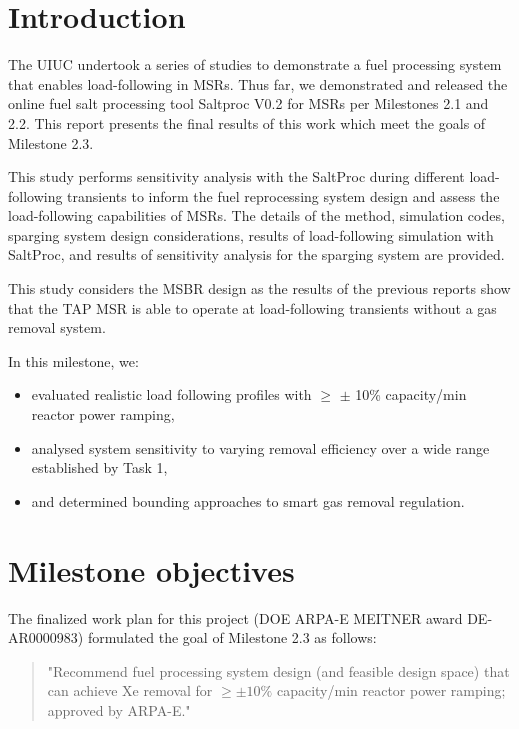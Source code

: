 \section{Introduction}

    The \gls{UIUC} undertook a series of 
    studies to demonstrate a fuel processing system that enables load-following 
    in \glspl{MSR}. Thus far, we demonstrated and released the 
    online fuel salt processing tool Saltproc V0.2 
    \cite{rykhlevskii_saltproc_2018} for \glspl{MSR} per Milestones 
    2.1 and 2.2. This report presents the final results of this work which 
    meet the goals of 
    Milestone 2.3.

    This study performs sensitivity analysis with the SaltProc during different 
    load-following transients to inform the fuel reprocessing system design and 
    assess the load-following capabilities of \glspl{MSR}. The details of the 
    method, simulation codes, sparging system design considerations, results of 
    load-following simulation with SaltProc, and results of sensitivity analysis 
    for the sparging system are provided.

    This study considers the \gls{MSBR}
    \cite{robertson_conceptual_1971} design as the results of the previous 
    reports \cite{rykhlevskii_milestone_2019} show that the TAP MSR is able to 
    operate at load-following transients without a gas removal system. 


    In this milestone, we:
    \begin{itemize}
            \item evaluated realistic load following profiles with $\geq$ $\pm$ 10\% capacity/min reactor power ramping, 
            \item analysed system sensitivity to varying removal efficiency 
                    over a wide range established by Task 1,
            \item and determined bounding approaches to smart gas removal regulation.
    \end{itemize}

\section{Milestone objectives}

    The finalized work plan for this project (DOE ARPA-E MEITNER award 
    DE-AR0000983) formulated the goal of Milestone 2.3 as follows:

    \begin{quotation}
        "Recommend fuel processing system design (and feasible design
        space) that can achieve Xe removal for $\ge \pm 10\%$ capacity/min 
            reactor power ramping; approved by ARPA-E."
    \end{quotation}

